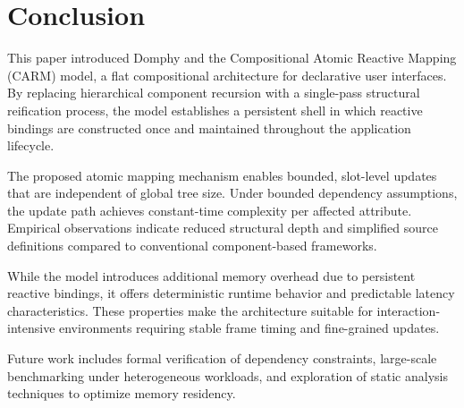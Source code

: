 \section{Conclusion}

This paper introduced Domphy and the Compositional Atomic Reactive
Mapping (CARM) model, a flat compositional architecture for declarative
user interfaces. By replacing hierarchical component recursion with a
single-pass structural reification process, the model establishes a
persistent shell in which reactive bindings are constructed once and
maintained throughout the application lifecycle.

The proposed atomic mapping mechanism enables bounded, slot-level
updates that are independent of global tree size. Under bounded
dependency assumptions, the update path achieves constant-time
complexity per affected attribute. Empirical observations indicate
reduced structural depth and simplified source definitions compared to
conventional component-based frameworks.

While the model introduces additional memory overhead due to persistent
reactive bindings, it offers deterministic runtime behavior and predictable
latency characteristics. These properties make the architecture suitable
for interaction-intensive environments requiring stable frame timing and
fine-grained updates.

Future work includes formal verification of dependency constraints,
large-scale benchmarking under heterogeneous workloads, and exploration
of static analysis techniques to optimize memory residency.
